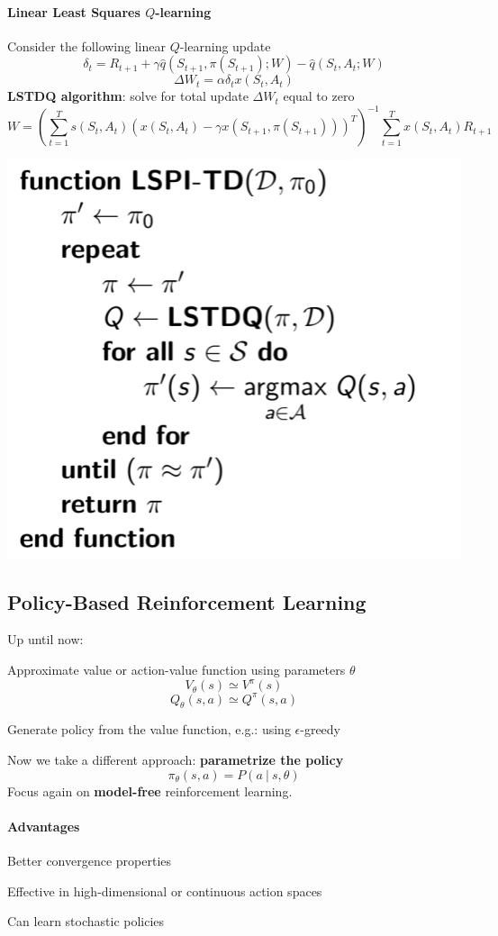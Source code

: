 \documentclass[10pt]{report}
\begin{document}
\paragraph{Linear Least Squares $Q$-learning} Consider the following linear $Q$-learning update
$$\delta_t = R_{t+1}+\gamma\hat{q}(S_{t+1},\pi(S_{t+1});W)-\hat{q}(S_t,A_t;W)$$
$$\Delta W_t = \alpha\delta_t x(S_t,A_t)$$
\textbf{LSTDQ algorithm}: solve for total update $\Delta W_t$ equal to zero
$$W = \left(\sum_{t=1}^T s(S_t,A_t)(x(S_t,A_t)-\gamma x(S_{t+1},\pi(S_{t+1})))^T\right)^{-1}\sum_{t=1}^Tx(S_t,A_t)R_{t+1}$$
\begin{center}
	\includegraphics[scale=0.5]{181.png}
\end{center}
\subsection{Policy-Based Reinforcement Learning}
Up until now:
\begin{list}{}{}
	\item Approximate value or action-value function using parameters $\theta$
	$$V_\theta(s)\simeq V^\pi(s)$$
	$$Q_\theta(s,a)\simeq Q^\pi(s,a)$$
	\item Generate policy from the value function, e.g.: using $\epsilon$-greedy
\end{list}
Now we take a different approach: \textbf{parametrize the policy} $$\pi_\theta(s,a) = P(a\:|\:s,\theta)$$
Focus again on \textbf{model-free} reinforcement learning.
\paragraph{Advantages}
\begin{list}{}{}
	\item Better convergence properties
	\item Effective in high-dimensional or continuous action spaces
	\item Can learn stochastic policies
\end{list}
\end{document}
